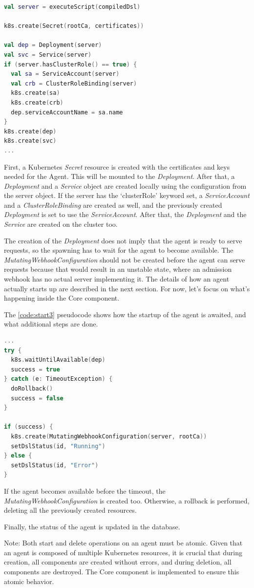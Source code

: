 \begin{lstlisting}[caption={Spawning of an agent},language=Kotlin,label=code:start2]
val server = executeScript(compiledDsl)

k8s.create(Secret(rootCa, certificates))

val dep = Deployment(server)
val svc = Service(server)
if (server.hasClusterRole() == true) {
  val sa = ServiceAccount(server)
  val crb = ClusterRoleBinding(server)
  k8s.create(sa)
  k8s.create(crb)
  dep.serviceAccountName = sa.name
}
k8s.create(dep)
k8s.create(svc)
...
\end{lstlisting}

First, a Kubernetes \emph{Secret} resource is created with the certificates and keys needed for the Agent. This will be mounted to the \emph{Deployment}.
After that, a \emph{Deployment} and a \emph{Service} object are created locally using the configuration from the server object. If the server has the `clusterRole' keyword set, a \emph{ServiceAccount} and a \emph{ClusterRoleBinding} are created as well, and the previously created \emph{Deployment} is set to use the \emph{ServiceAccount}. After that, the \emph{Deployment} and the \emph{Service} are created on the cluster too.

The creation of the \emph{Deployment} does not imply that the agent is ready to serve requests, so the spawning has to wait for the agent to become available. The \emph{MutatingWebhookConfiguration} should not be created before the agent can serve requests because that would result in an unstable state, where an admission webhook has no actual server implementing it. The details of how an agent actually starts up are described in the next section. For now, let's focus on what's happening inside the Core component.

The \ref{code:start3} pseudocode shows how the startup of the agent is awaited, and what additional steps are done.

\begin{lstlisting}[caption={Spawning of an agent},language=Kotlin,label=code:start3]
...
try {
  k8s.waitUntilAvailable(dep)
  success = true
} catch (e: TimeoutException) {
  doRollback()
  success = false
}
        
if (success) {
  k8s.create(MutatingWebhookConfiguration(server, rootCa))
  setDslStatus(id, "Running")
} else {
  setDslStatus(id, "Error")
}
\end{lstlisting}

If the agent becomes available before the timeout, the \emph{MutatingWebhookConfiguration} is created too. Otherwise, a rollback is performed, deleting all the previously created resources.

Finally, the status of the agent is updated in the database.

Note: Both start and delete operations on an agent must be atomic. Given that an agent is composed of multiple Kubernetes resources, it is crucial that during creation, all components are created without errors, and during deletion, all components are destroyed. The Core component is implemented to ensure this atomic behavior.
